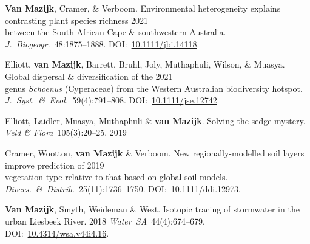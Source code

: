 \begin{hangparas}{2em}{1}

\textbf{Van Mazijk}, Cramer, \& Verboom.
Environmental heterogeneity explains contrasting plant species richness \hfill 2021 \\
\hspace{2em} between the South African Cape \& southwestern Australia. \\
\hspace{2em} \textit{J.~Biogeogr.}~48:1875--1888.
DOI:~\href{https://doi.org/10.1111/jbi.14118}{10.1111/jbi.14118}.

Elliott, \textbf{van Mazijk}, Barrett, Bruhl,
Joly, Muthaphuli, Wilson, \& Muasya.
Global dispersal \& diversification of the                              \hfill 2021 \\
\hspace{2em} genus \textit{Schoenus} (Cyperaceae)
  from the Western Australian biodiversity hotspot. \\
\hspace{2em} \textit{J.~Syst.~\&~Evol.}~59(4):791--808.
DOI:~\href{https://doi.org/10.1111/jse.1274}{10.1111/jse.12742}

Elliott, Laidler, Muasya, Muthaphuli \& \textbf{van Mazijk}.
Solving the sedge mystery.
\textit{Veld \& Flora}~105(3):20--25. \hfill 2019

Cramer, Wootton, \textbf{van Mazijk} \& Verboom.
New regionally-modelled soil layers improve prediction of               \hfill 2019 \\
\hspace{2em} vegetation type
  relative to that based on global soil models. \\
\hspace{2em} \textit{Divers.~\&~Distrib.}~25(11):1736--1750.
DOI:~\href{https://doi.org/10.1111/ddi.12973}{10.1111/ddi.12973}.

\textbf{Van Mazijk}, Smyth, Weideman \& West.
Isotopic tracing of stormwater in the urban Liesbeek River.             \hfill 2018
\textit{Water~SA}~44(4):674--679.
DOI:~\href{https://doi.org/10.4314/wsa.v44i4.16}{10.4314/wsa.v44i4.16}.

\end{hangparas}
